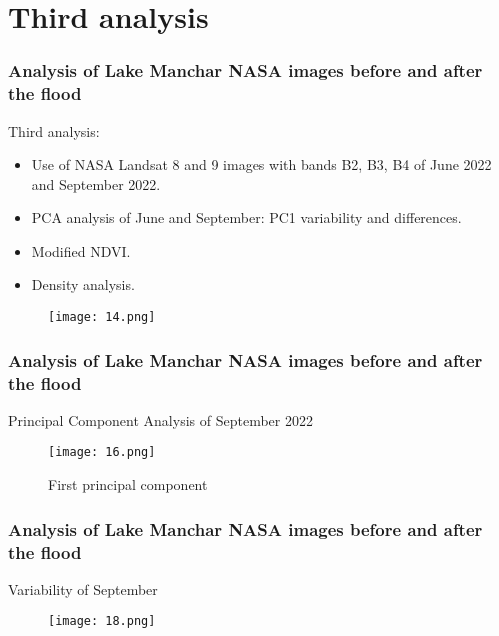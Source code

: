 \documentclass{beamer}
\begin{document}
\section{Third analysis}

\begin{frame}
  \frametitle{\small Analysis of Lake Manchar NASA images before and after the flood} 
  
    \small Third analysis:
    \begin{itemize}
        \item \small Use of NASA Landsat 8 and 9 images with bands B2, B3, B4 of June 2022 and September 2022.
        \item \small PCA analysis of June and September: PC1 variability and differences.
        \item \small Modified NDVI.
        \item \small Density analysis.
    \end{itemize}

    \begin{figure}
        \centering
        \texttt{[image: 14.png]}
        \label{fig:enter-label}
    \end{figure}
  
\end{frame}

\begin{frame}
  \frametitle{\small Analysis of Lake Manchar NASA images before and after the flood} 

    \centering\small Principal Component Analysis of September 2022

    \begin{figure}
        \centering
        \texttt{[image: 16.png]}
        \caption{First principal component}
        \label{fig:enter-label}
    \end{figure}

\end{frame}

\begin{frame}
  \frametitle{\small Analysis of Lake Manchar NASA images before and after the flood} 

    \centering\small Variability of September
  
\begin{figure}
    \centering
    \texttt{[image: 18.png]}
    \label{fig:enter-label}
\end{figure}
  

\end{frame}
\end{document}
